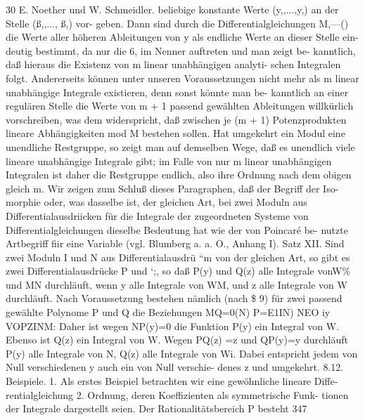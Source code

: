 \documentclass[11pt,a4paper]{article}
\theoremstyle{plain}
\theoremstyle{definition}
\begin{document}
30 
E. Noether und W. Schmeidler. 
beliebige konstante Werte (y,,...,y,) 
an der Stelle (ß,,..., ß,) vor- 
geben. 
Dann sind durch die Differentialgleichungen M,---() die Werte 
aller höheren Ableitungen von y als endliche Werte an dieser Stelle ein- 
deutig bestimmt, da nur die 6, im Nenner auftreten und man zeigt be- 
kanntlich, daß hieraus 
die Existenz von m linear unabhängigen analyti- 
schen Integralen folgt. 
Andererseits 
können unter unseren Voraussetzungen 
nicht mehr als 
m linear unabhängige Integrale existieren, 
denn 
sonst 
könnte man be- 
kanntlich an einer regulären Stelle die Werte von m + 1 passend gewählten 
Ableitungen willkürlich vorschreiben, was dem widerspricht, daß zwischen 
je (m + 1) Potenzprodukten lineare Abhängigkeiten mod M bestehen sollen. 
Hat umgekehrt ein Modul eine unendliche Restgruppe, so zeigt man 
auf demselben Wege, daß es unendlich viele lineare unabhängige Integrale 
gibt; im Falle von nur m linear unabhängigen Integralen ist daher die 
Restgruppe endlich, also ihre Ordnung nach dem obigen gleich m. 
Wir zeigen zum Schluß dieses Paragraphen, daß der Begriff der Iso- 
morphie 
oder, was dasselbe ist, der gleichen Art, 
bei zwei Moduln aus 
Differentialausdriicken 
für die Integrale der zugeordneten Systeme von 
Differentialgleichungen dieselbe Bedeutung hat wie der von Poincaré be- 
nutzte Artbegriff fiir eine Variable (vgl. Blumberg a. a. O., Anhang I). 
Satz XII. 
Sind zwei Moduln 
I und N aus Differentialausdrü ``m 
von der gleichen Art, so gibt es zwei Differentialausdrücke P und 
`;, so 
daß P(y) und Q(z) alle Integrale vonW\% und MN durchläuft, wenn y alle 
Integrale von WM, und z alle Integrale von W durchläuft. 
Nach Voraussetzung bestehen 
nämlich (nach \$ 9) für zwei passend 
gewählte Polynome P und Q die Beziehungen 
MQ=0(N) 
P=E1IN) 
NEO iy 
VOPZINM: 
Daher 
ist wegen NP(y)=0 
die Funktion P(y) ein Integral von W. 
Ebenso ist Q(z) ein Integral von W. Wegen PQ(z) =z und QP(y)=y 
durchläuft P(y) alle Integrale von N, Q(z) alle Integrale von Wi. Dabei 
entspricht jedem von Null verschiedenen y auch ein von Null verschie- 
denes z und umgekehrt. 
8.12. 
Beispiele. 
1. Als erstes Beispiel betrachten wir eine gewöhnliche lineare Diffe- 
rentialgleichung 
2. Ordnung, deren Koeffizienten als symmetrische Funk- 
tionen der Integrale dargestellt seien. 
Der Rationalitätsbereich P besteht 
347
\end{document}
